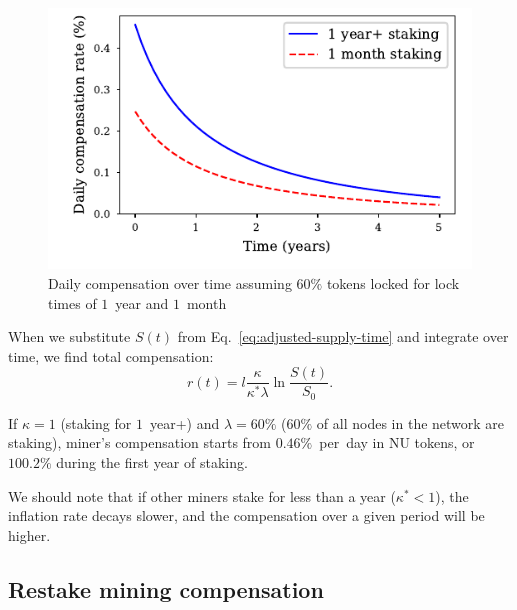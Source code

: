 \documentclass[longbibliography,nofootinbib,twocolumn]{revtex4-1}
\begin{document}
\begin{figure}
    \includegraphics[width=\columnwidth]{pdf/daily-compensation.pdf}
    \caption{Daily compensation over time assuming $60\%$ tokens locked for lock times of $1$~year and $1$~month}
    \label{fig:daily-compensation}
\end{figure}

When we substitute $S(t)$ from Eq.~\ref{eq:adjusted-supply-time} and integrate over time, we find total compensation:
\begin{equation}
    r(t) = l \frac{\kappa}{\kappa^* \lambda} \ln\frac{S(t)}{S_0}.
\end{equation}

If $\kappa=1$ (staking for $1$~year+) and $\lambda=60\%$ ($60\%$ of all nodes in the network are staking),
miner's compensation starts from $0.46\%$~per~day in NU tokens,
or $100.2\%$ during the first year of staking.

We should note that if other miners stake for less than a year ($\kappa^* < 1$), the inflation rate decays slower, and the compensation over a given period
will be higher.

\subsection{Restake mining compensation}
\end{document}

